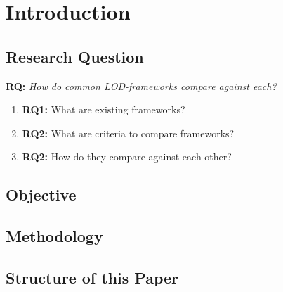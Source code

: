 \chapter{Introduction}
\section{Research Question}
\textbf{RQ:} \textit{How do common LOD-frameworks compare against each?}
\begin{enumerate}
\item \textbf{RQ1:} What are existing frameworks?
\item \textbf{RQ2:} What are criteria to compare frameworks?
\item \textbf{RQ2:} How do they compare against each other?
\end{enumerate}

\section{Objective}
\section{Methodology}
\section{Structure of this Paper}